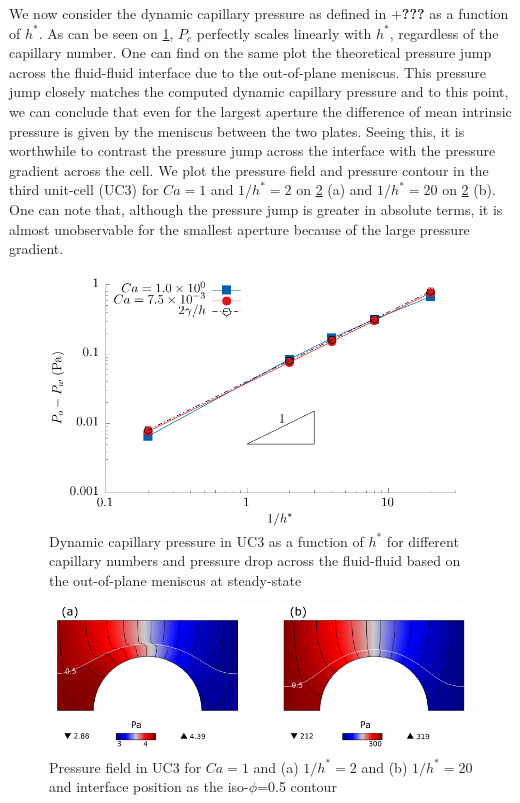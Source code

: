 \documentclass[]{article}
\begin{document}
We now consider the dynamic capillary pressure as defined in
+\textbf{???} as a function of \(h^*\). As can be seen on \cref{fig:Pc},
\(P_c\) perfectly scales linearly with \(h^*\), regardless of the
capillary number. One can find on the same plot the theoretical pressure
jump across the fluid-fluid interface due to the out-of-plane meniscus.
This pressure jump closely matches the computed dynamic capillary
pressure and to this point, we can conclude that even for the largest
aperture the difference of mean intrinsic pressure is given by the
meniscus between the two plates. Seeing this, it is worthwhile to
contrast the pressure jump across the interface with the pressure
gradient across the cell. We plot the pressure field and pressure
contour in the third unit-cell (UC3) for \(Ca=1\) and \(1/h^*=2\) on
\cref{fig:pFieldCa1} (a) and \(1/h^*=20\) on \cref{fig:pFieldCa1} (b).
One can note that, although the pressure jump is greater in absolute
terms, it is almost unobservable for the smallest aperture because of
the large pressure gradient.

\begin{figure}
\hypertarget{fig:Pc}{%
\centering
\includegraphics{figures/pdf/Pc.pdf}
\caption{Dynamic capillary pressure in UC3 as a function of \(h^*\) for
different capillary numbers and pressure drop across the fluid-fluid
based on the out-of-plane meniscus at steady-state}\label{fig:Pc}
}
\end{figure}

\begin{figure}
\hypertarget{fig:pFieldCa1}{%
\centering
\includegraphics{figures/pdf/pFieldCa1.pdf}
\caption{Pressure field in UC3 for \(Ca=1\) and (a) \(1/h^*=2\) and (b)
\(1/h^*=20\) and interface position as the iso-\(\phi\)=0.5
contour}\label{fig:pFieldCa1}
}
\end{figure}
\end{document}
